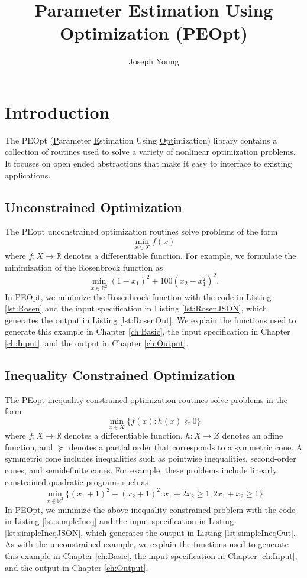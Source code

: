 \documentclass{report}
\title{Parameter Estimation Using Optimization (PEOpt)}
\author{Joseph Young}
\newcommand{\re}{\mathbb{R}}
\begin{document}
\maketitle
\tableofcontents

\chapter{Introduction}

        The PEOpt (\underline{P}arameter \underline{E}stimation Using \underline{Opt}imization) library contains a collection of routines used to solve a variety of nonlinear optimization problems.  It focuses on open ended abstractions that make it easy to interface to existing applications.

\section{Unconstrained Optimization}

        The PEopt unconstrained optimization routines solve problems of the form
$$
        \min_{x\in X} f(x)
$$
where $f:X\rightarrow \re$ denotes a differentiable function.  For example, we formulate the minimization of the Rosenbrock function as
$$
        \min_{x\in\re^2} (1-x_1)^2+100(x_2-x_1^2)^2.
$$
In PEOpt, we minimize the Rosenbrock function with the code in Listing \ref{lst:Rosen} and the input specification in Listing \ref{lst:RosenJSON}, which generates the output in Listing \ref{lst:RosenOut}.  We explain the functions used to generate this example in Chapter \ref{ch:Basic}, the input specification in Chapter \ref{ch:Input}, and the output in Chapter \ref{ch:Output}.





\section{Inequality Constrained Optimization}

        The PEopt inequality constrained optimization routines solve problems in the form
$$
        \min_{x\in X} \{ f(x) : h(x)\succeq 0\}
$$
where $f:X\rightarrow \re$ denotes a differentiable function, $h:X\rightarrow Z$ denotes an affine function, and $\succeq$ denotes a partial order that corresponds to a symmetric cone.  A symmetric cone includes inequalities such as pointwise inequalities, second-order cones, and semidefinite cones.  For example, these problems include linearly constrained quadratic programs such as
$$
        \min_{x\in\re^2}\{(x_1+1)^2+(x_2+1)^2 : x_1 + 2x_2 \geq 1, 2x_1 + x_2\geq 1\}
$$
In PEOpt, we minimize the above inequality constrained problem with the code in Listing \ref{lst:simpleIneq} and the input specification in Listing \ref{lst:simpleIneqJSON}, which generates the output in Listing \ref{lst:simpleIneqOut}.  As with the unconstrained example, we explain the functions used to generate this example in Chapter \ref{ch:Basic}, the input specification in Chapter \ref{ch:Input}, and the output in Chapter \ref{ch:Output}.
\end{document}
